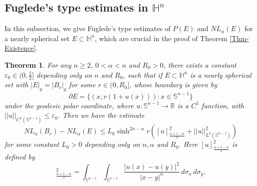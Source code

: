 \documentclass[11pt,reqno]{amsart}
\newtheorem{thm}{Theorem}[section]
\theoremstyle{definition}
\theoremstyle{remark}
\numberwithin{equation}{section}
\renewcommand{\(}{\left(}
\renewcommand{\)}{\right)}
\renewcommand{\-}{\overline}
\begin{document}
\subsection{Fuglede’s type estimates in $\mathbb{H}^n$} In this subsection, we give Fuglede’s type estimates of $P(E)$ and $NL_{\alpha}(E)$ for a nearly spherical set $E\subset\mathbb{H}^n$, which are crucial in the proof of Theorem \ref{Thm-Existence}.
\begin{thm}\label{Thm-Fuglede}
	For any $n\geq 2$, $0<\alpha<n$ and $R_0>0$, there exists a constant $\varepsilon_0\in(0,\frac{1}{2}]$ depending only on $n$ and $R_0$, such that if $E\subset\mathbb{H}^n$ is a nearly spherical set with $|E|_g=|B_r|_g$ for some $r\in(0,R_0]$, whose boundary is given by 
	\begin{equation}\label{Eq-Fuglede}
		\partial E=\{(x,r(1+u(x))):x\in\mathbb{S}^{n-1}\}
	\end{equation}
	under the geodesic polar coordinate, where $u:\mathbb{S}^{n-1}\to\mathbb{R}$ is a $C^1$ function, with $||u||_{C^1(\mathbb{S}^{n-1})}\leq\varepsilon_0$. Then we have the estimate 
	\begin{equation}\label{Eq-F1}
		NL_{\alpha}(B_r)-NL_{\alpha}(E)\leq L_0{\sinh}^{2n-\alpha} r\left([u]^2_{\frac{\alpha+1-n}{2}}+||u||^2_{L^2(
			\mathbb{S}^{n-1})}\right)
	\end{equation}
	for some constant $L_0>0$ depending only on $n,\alpha$ and $R_0$. Here $[u]^2_{\frac{\alpha+1-n}{2}}$ is defined by
	\begin{equation*}
		[u]^2_{\frac{\alpha+1-n}{2}}=\int_{\mathbb{S}^{n-1}}\int_{\mathbb{S}^{n-1}}\frac{|u(x)-u(y)|^2}{|x-y|^{\alpha}}\,d\sigma_x\,d\sigma_y.
	\end{equation*}
\end{thm}  
\end{document}

